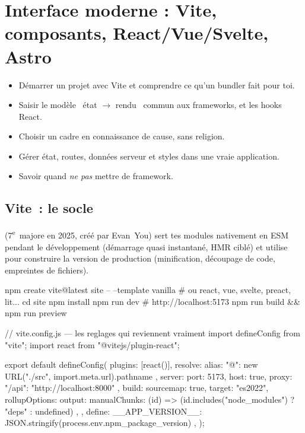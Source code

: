 \chapter{Interface moderne : Vite, composants, React/Vue/Svelte, Astro}
\label{ch-js-frameworks}

\begin{objectif}
\begin{itemize}
  \item D\'emarrer un projet avec Vite et comprendre ce qu'un bundler fait pour toi.
  \item Saisir le mod\`ele \og ~\'etat $\rightarrow$ rendu~ \fg{} commun aux frameworks, et les hooks React.
  \item Choisir un cadre en connaissance de cause, sans religion.
  \item G\'erer \'etat, routes, donn\'ees serveur et styles dans une vraie application.
  \item Savoir quand \emph{ne pas} mettre de framework.
\end{itemize}
\end{objectif}

\section{Vite~: le socle}

 (7\textsuperscript{e}~majore en 2025, cr\'e\'e par Evan~You) sert tes
modules nativement en ESM pendant le d\'eveloppement (d\'emarrage quasi instantan\'e, HMR cibl\'e) et
utilise  pour construire la version de production
(minification, d\'ecoupage de code, empreintes de fichiers).

\begin{terminal}
npm create vite@latest site -- --template vanilla        # ou react, vue, svelte, preact, lit...
cd site
npm install
npm run dev              # http://localhost:5173
npm run build && npm run preview
\end{terminal}

\begin{codejs}
// vite.config.js --- les reglages qui reviennent vraiment
import { defineConfig } from "vite";
import react from "@vitejs/plugin-react";

export default defineConfig({
  plugins: [react()],
  resolve: { alias: { "@": new URL("./src", import.meta.url).pathname } },
  server: { port: 5173, host: true, proxy: { "/api": "http://localhost:8000" } },
  build: {
    sourcemap: true,
    target: "es2022",
    rollupOptions: { output: { manualChunks: (id) => (id.includes("node_modules") ? "deps" : undefined) } },
  },
  define: { __APP_VERSION__: JSON.stringify(process.env.npm_package_version) },
});
\end{codejs}

